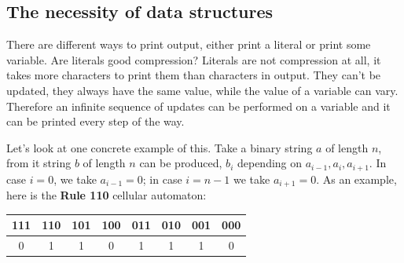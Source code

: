 \begin{center}
\end{center}

\newpage

\subsection{The necessity of data structures}

There are different ways to print output, either print a literal or print some variable.
Are literals good compression?
Literals are not compression at all, it takes more characters to print them than characters in output.
They can't be updated, they always have the same value, while the value of a variable can vary.
Therefore an infinite sequence of updates can be performed on a variable and it can be printed every step of the way.

Let's look at one concrete example of this.
Take a binary string $a$ of length $n$, from it string $b$ of length $n$ can be produced, $b_i$ depending on $a_{i-1}, a_i, a_{i+1}$.
In case $i=0$, we take $a_{i-1} = 0$; in case $i=n-1$ we take $a_{i+1} = 0$.
As an example, here is the \textbf{Rule 110} cellular automaton:

\begin{table}[h!]
\centering
 \begin{tabular}{|c|c|c|c|c|c|c|c|} 
 \hline
 111 & 110 & 101 & 100 & 011 & 010 & 001 & 000 \\ [0.5ex] 
 \hline
 0 & 1 & 1 & 0 & 1 & 1 & 1 & 0 \\ 
 \hline
\end{tabular}
\end{table}

